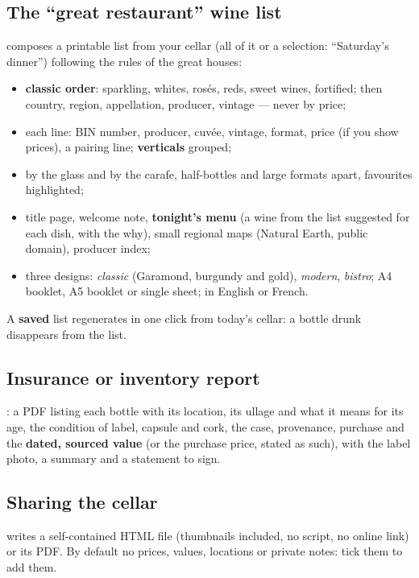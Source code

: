 \documentclass[11pt,a4paper]{article}
\begin{document}
\subsection{The ``great restaurant'' wine list}
 composes a printable list from your cellar (all of it or a selection:
``Saturday's dinner'') following the rules of the great houses:
\begin{itemize}
  \item \textbf{classic order}: sparkling, whites, rosés, reds, sweet wines, fortified; then country, region,
        appellation, producer, vintage — never by price;
  \item each line: BIN number, producer, cuvée, vintage, format, price (if you show prices), a pairing line;
        \textbf{verticals} grouped;
  \item by the glass and by the carafe, half-bottles and large formats apart, favourites highlighted;
  \item title page, welcome note, \textbf{tonight's menu} (a wine from the list suggested for each dish, with
        the why), small regional maps (Natural Earth, public domain), producer index;
  \item three designs: \emph{classic} (Garamond, burgundy and gold), \emph{modern}, \emph{bistro}; A4
        booklet, A5 booklet or single sheet; in English or French.
\end{itemize}
A \textbf{saved} list regenerates in one click from today's cellar: a bottle drunk disappears from the list.


\subsection{Insurance or inventory report}
: a PDF listing each bottle with its location, its ullage
and what it means for its age, the condition of label, capsule and cork, the case, provenance, purchase and
the \textbf{dated, sourced value} (or the purchase price, stated as such), with the label photo, a summary and
a statement to sign.


\subsection{Sharing the cellar}
 writes a self-contained HTML file (thumbnails included, no
script, no online link) or its PDF. By default no prices, values, locations or private notes: tick them to add
them.
\end{document}
